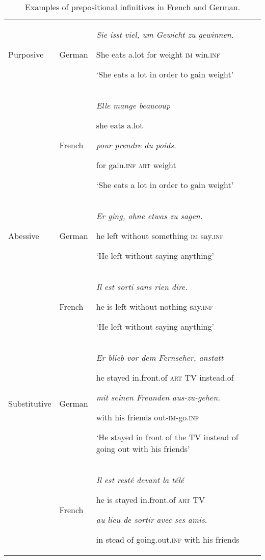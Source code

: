 \documentclass[output=paper]{langscibook}
\begin{document}
\begin{table}
\caption{Examples of prepositional infinitives in French and German.}
\label{tab:kalm:1}


\begin{tabularx}{\textwidth}{p{2cm}lQ}

\lsptoprule

Purposive & German & \textit{Sie   isst   viel,   um   Gewicht   zu   gewinnen.} 

She  eats  a.lot   for   weight     \textsc{im}   win.\textsc{inf}

‘She eats a lot in order to gain weight’\\
& French & \textit{Elle   mange   beaucoup} 

she   eats   a.lot

\textit{pour   prendre   du   poids.}

for   gain.\textsc{inf}   \textsc{art}   weight 

‘She eats a lot in order to gain weight’\\

\tablevspace
Abessive & German & \textit{Er   ging,   ohne     etwas     zu   sagen.}

he   left   without   something   \textsc{im}   say.\textsc{inf}

‘He left without saying anything’\\
& French & \textit{Il   est   sorti   sans     rien     dire.} 

he   is   left   without   nothing   say.\textsc{inf}

‘He left without saying anything’\\

\tablevspace
Substitutive & German & \textit{Er   blieb   vor     dem   Fernseher,   anstatt} 

he   stayed   in.front.of   \textsc{art}   TV     instead.of

\textit{mit   seinen   Freunden   aus-zu-gehen.} 

with   his   friends   out-\textsc{im}{}-go.\textsc{inf}

‘He stayed in front of the TV instead of going out with his friends’\\
& French & \textit{Il   est   resté   devant     la   télé} 

he   is   stayed   in.front.of   \textsc{art}   TV 

\textit{au   lieu   de   sortir     avec   ses   amis.} 

in   stead   of   going.out.\textsc{inf}    with   his   friends


\end{tabularx}
\end{table}
\end{document}

